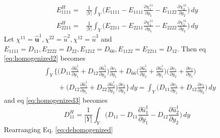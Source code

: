 \documentclass[10pt]{article}
\newcommand{\e}[1]{\textbf{#1}}
\begin{document}
\begin{eqnarray}
\label{eq:homogenized3}
E^H_{1111} = &\frac{1}{|Y|}\int_Y\bigg ( E_{1111} - E_{1111}\frac{\partial \chi^{11}_1}{\partial y_1} - E_{1122}\frac{\partial \chi^{11}_2}{\partial y_2}\bigg )\,dy\\
E^H_{2211} = &\frac{1}{|Y|}\int_Y\bigg ( E_{2211} - E_{2211}\frac{\partial \chi^{11}_1}{\partial y_1} - E_{2222}\frac{\partial \chi^{11}_2}{\partial y_2}\bigg )\,dy
\end{eqnarray}
Let $\chi^{11} = \hat{\e u}^1, \chi^{22} = \hat u^2, \chi^{12} = \hat u^3$ and $E_{1111} = D_{11}, E_{2222} = D_{22}, E_{1212} = D_{66}, E_{1122} = E_{2211} = D_{12}$. Then eq \eqref{eq:homogenized2} becomes
\begin{equation}
\label{eq:dehomogenized}
\begin{split}
&\int_Y \bigg \{\bigg ( D_{11}\frac{\partial \hat u^1_1}{\partial y_1} + D_{12}\frac{\partial \hat u^1_2}{\partial y_2}\bigg )\frac{\partial v_1}{\partial y_1}
+ D_{66}\bigg (\frac{\partial \hat u^1_1}{\partial y_2} + \frac{\partial \hat u^1_2}{\partial y_1}\bigg )\bigg (\frac{\partial v_1}{\partial y_2} +\frac{\partial v_2}{\partial y_1}\bigg )\\
&\qquad + \bigg (D_{12}\frac{\partial \hat u^1_1}{\partial y_1} + D_{22}\frac{\partial \hat u^1_2}{\partial y_2}\bigg )\frac{\partial v_2}{\partial y_2}\bigg \}\,dy = \int_Y\bigg (D_{11}\frac{\partial v_1}{\partial y_1}+D_{12}\frac{\partial v_2}{\partial y_2}\bigg )\, dy
\end{split}
\end{equation}
and eq \eqref{eq:homogenized3} becomes
\begin{equation}
\label{Dhomo}
D^H_{11} = \frac{1}{|Y|}\int_Y\bigg (D_{11}-D_{11}\frac{\partial\hat u^1_1}{\partial y_1} - D_{12}\frac{\partial \hat u^1_2}{\partial y_2}\bigg )\,dy
\end{equation}
Rearranging Eq. \eqref{eq:dehomogenized}
\end{document}
